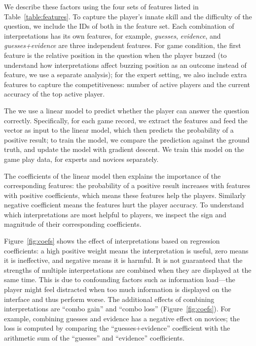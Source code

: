 We describe these factors using the four sets of features listed in
Table~\ref{table:features}.
To capture the player's innate skill and the difficulty of the
question, we include the IDs of both in the feature set.  Each
combination of interpretations has its own features, for example,
\emph{guesses}, \emph{evidence}, and \emph{guesses+evidence} are three
independent features.  For game condition, the first feature is the
relative position in the question when the player buzzed (to
understand how interpretations affect buzzing position as an outcome
instead of feature, we use a separate analysis); for the expert
setting, we also include extra features to capture the
competitiveness: number of active players and the current accuracy of
the top active player.

The we use a linear model to predict whether the player can answer the
question correctly.  Specifically, for each game record, we extract
the features and feed the vector as input to the linear model, which
then predicts the probability of a positive result; to train the
model, we compare the prediction against the ground truth, and update
the model with gradient descent.  We train this model on the game play
data, for experts and novices separately.

The coefficients of the linear model then explains the
importance of the corresponding features: the probability of a
positive result increases with features with positive coefficients, which
means these features help the players. Similarly negative coefficient
means the features hurt the player accuracy.  To understand which
interpretations are most helpful to \qb{} players, we inspect the sign
and magnitude of their corresponding coefficients.

Figure~\ref{fig:coefs} shows the effect of interpretations based on
regression coefficients: a high positive weight means the
interpretation is useful, zero means it is ineffective, and negative
means it is harmful.
It is not guaranteed that the strengths of multiple interpretations
are combined when they are displayed at the same time.
This is due to confounding factors such as information load---the
player might feel distracted when too much information is displayed on
the interface and thus perform worse.
The additional effects of combining
interpretations are ``combo gain'' and ``combo loss''
(Figure~\ref{fig:coefs}).
For example, combining guesses and evidence has a negative effect on
novices; the loss is computed by comparing the ``guesses+evidence''
coefficient with the arithmetic sum of the ``guesses'' and
``evidence'' coefficients.

